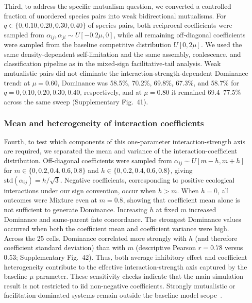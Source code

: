 Third, to address the specific mutualism question, we converted a controlled fraction of unordered species pairs into weak bidirectional mutualisms. For $q \in \{0,0.10,0.20,0.30,0.40\}$ of species pairs, both reciprocal coefficients were sampled from $\alpha_{ij},\alpha_{ji}\sim U[-0.2\mu,0]$, while all remaining off-diagonal coefficients were sampled from the baseline competitive distribution $U[0,2\mu]$. We used the same density-dependent self-limitation and the same assembly, coalescence, and classification pipeline as in the mixed-sign facilitative-tail analysis. Weak mutualistic pairs did not eliminate the interaction-strength-dependent Dominance trend: at $\mu=0.60$, Dominance was 58.5\%, 70.2\%, 69.8\%, 67.3\%, and 58.7\% for $q=0,0.10,0.20,0.30,0.40$, respectively, and at $\mu=0.80$ it remained 69.4--77.5\% across the same sweep (Supplementary Fig.~41).

\subsubsection*{Mean and heterogeneity of interaction coefficients}

Fourth, to test which components of this one-parameter interaction-strength axis are required, we separated the mean and variance of the interaction-coefficient distribution. Off-diagonal coefficients were sampled from $\alpha_{ij}\sim U[m-h,m+h]$ for $m \in \{0,0.2,0.4,0.6,0.8\}$ and $h \in \{0,0.2,0.4,0.6,0.8\}$, giving $\mathrm{std}(\alpha_{ij})=h/\sqrt{3}$. Negative coefficients, corresponding to positive ecological interactions under our sign convention, occur when $h>m$. When $h=0$, all outcomes were Mixture even at $m=0.8$, showing that coefficient mean alone is not sufficient to generate Dominance. Increasing $h$ at fixed $m$ increased Dominance and same-parent fate concordance. The strongest Dominance values occurred when both the coefficient mean and coefficient variance were high. Across the 25 cells, Dominance correlated more strongly with $h$ (and therefore coefficient standard deviation) than with $m$ (descriptive Pearson $r=0.78$ versus $0.53$; Supplementary Fig.~42). Thus, both average inhibitory effect and coefficient heterogeneity contribute to the effective interaction-strength axis captured by the baseline $\mu$ parameter. These sensitivity checks indicate that the main simulation result is not restricted to iid non-negative coefficients. Strongly mutualistic or facilitation-dominated systems remain outside the baseline model scope~\citep{Tikhonov2016,Lechon2021}.

